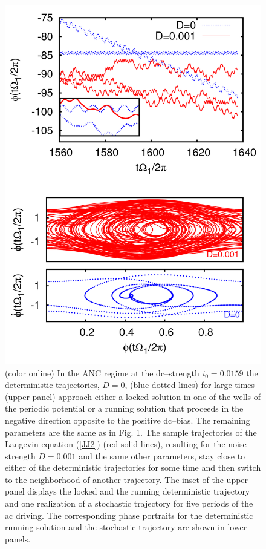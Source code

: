 \documentclass{physeauth}
\begin{document}
\begin{figure}
\includegraphics[width=1\linewidth]{fig2}
\caption{(color online) 
In the ANC regime at the dc--strength $i_{0}=0.0159$ the
deterministic trajectories, $D=0$,  (blue dotted lines) for large times (upper
panel)  approach  
either a locked solution in one of the wells of the periodic potential
or a running solution that proceeds in the negative direction opposite
to the positive dc--bias. The remaining parameters are the same as in
Fig. 1. The sample trajectories of the Langevin equation (\ref{JJ2})
(red solid lines), resulting for the noise strength $D= 0.001$ and the
same other parameters, stay close to either of the deterministic
trajectories for some time  and then switch to the neighborhood of
another trajectory. The inset of the upper panel displays the locked and the running
deterministic trajectory and one realization of a stochastic
trajectory for five periods of the ac driving.   The corresponding phase portraits for the  deterministic running solution and the stochastic trajectory are shown in lower panels.  
}
\label{fig2}
\end{figure}
\end{document}
